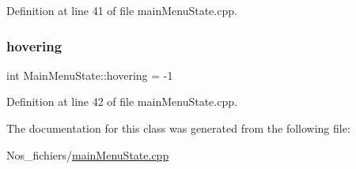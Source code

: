 Definition at line 41 of file main\+Menu\+State.\+cpp.

\mbox{\label{class_main_menu_state_ae40f9519e207f3f4d6b67f2c4e28dbfd}} 
\subsubsection{\texorpdfstring{hovering}{hovering}}
{\footnotesize\ttfamily int Main\+Menu\+State\+::hovering = -\/1}



Definition at line 42 of file main\+Menu\+State.\+cpp.



The documentation for this class was generated from the following file\+:\begin{DoxyCompactItemize}
\item 
Nos\+\_\+fichiers/\hyperlink{main_menu_state_8cpp}{main\+Menu\+State.\+cpp}\end{DoxyCompactItemize}
